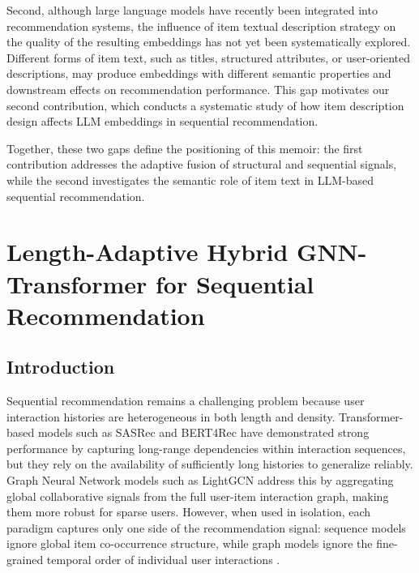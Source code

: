 \documentclass[12pt,a4paper]{report}
\begin{document}
Second, although large language models have recently been integrated into
recommendation systems, the influence of item textual description strategy on
the quality of the resulting embeddings has not yet been systematically
explored. Different forms of item text, such as titles, structured attributes,
or user-oriented descriptions, may produce embeddings with different semantic
properties and downstream effects on recommendation performance. This gap
motivates our second contribution, which conducts a systematic study of how item
description design affects LLM embeddings in sequential recommendation.

Together, these two gaps define the positioning of this memoir: the first
contribution addresses the adaptive fusion of structural and sequential signals,
while the second investigates the semantic role of item text in LLM-based
sequential recommendation.

\chapter{Length-Adaptive Hybrid GNN-Transformer for Sequential Recommendation}

\section{Introduction}

Sequential recommendation remains a challenging problem because user interaction
histories are heterogeneous in both length and density. Transformer-based models
such as SASRec \citep{kang2018sasrec} and BERT4Rec \citep{sun2019bert4rec} have
demonstrated strong performance by capturing long-range dependencies within
interaction sequences, but they rely on the availability of sufficiently long
histories to generalize reliably. Graph Neural Network models such as LightGCN
\citep{he2020lightgcn} address this by aggregating global collaborative signals
from the full user-item interaction graph, making them more robust for sparse
users. However, when used in isolation, each paradigm captures only one side of
the recommendation signal: sequence models ignore global item co-occurrence
structure, while graph models ignore the fine-grained temporal order of
individual user interactions \citep{wu2020gnnsurvey, pan2024survey}.
\end{document}
